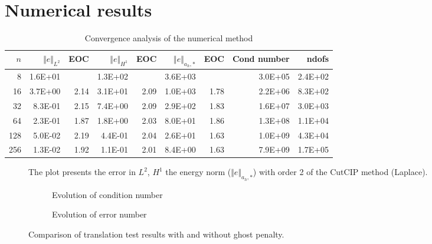 
\newpage
\section{Numerical results}%
\label{sec:numerical_results}


\begin{table}[h!]
    \caption{Convergence analysis of the numerical method}
    \label{table:CutFEM_error1}
  \begin{tabular}{rrrrrrrrr}
    \hline\hline
    \textbf{$n$} & \textbf{$\Vert e \Vert_{L^2}$} & \textbf{EOC} & \textbf{$ \Vert e \Vert_{H^1}$} & \textbf{EOC} & \textbf{$\Vert e \Vert_{ a_h,* }$} & \textbf{EOC} & \textbf{Cond number} & \textbf{ndofs} \\\hline
    8 & 1.6E+01 &  & 1.3E+02 &  & 3.6E+03 &  & 3.0E+05 & 2.4E+02 \\
    16 & 3.7E+00 & 2.14 & 3.1E+01 & 2.09 & 1.0E+03 & 1.78 & 2.2E+06 & 8.3E+02 \\
    32 & 8.3E-01 & 2.15 & 7.4E+00 & 2.09 & 2.9E+02 & 1.83 & 1.6E+07 & 3.0E+03 \\
    64 & 2.3E-01 & 1.87 & 1.8E+00 & 2.03 & 8.0E+01 & 1.86 & 1.3E+08 & 1.1E+04 \\
    128 & 5.0E-02 & 2.19 & 4.4E-01 & 2.04 & 2.6E+01 & 1.63 & 1.0E+09 & 4.3E+04 \\
    256 & 1.3E-02 & 1.92 & 1.1E-01 & 2.01 & 8.4E+00 & 1.63 & 7.9E+09 & 1.7E+05 \\\hline\hline
  \end{tabular}

\end{table}

\begin{figure}[h!]
    \centering
    
    \caption{The plot presents the error in $L^2$, $H^1$ the energy norm ($\Vert e \Vert_{a_h,*}$) with order 2 of the CutCIP method (Laplace).}
    \label{fig:CutFEM_error1}
\end{figure}

\begin{figure}[h!]
    \centering
    \begin{subfigure}{0.49\textwidth}
        \centering
        
        \caption{Evolution of condition number}
        \label{subfig:cond}
    \end{subfigure}
    \hfill
    \begin{subfigure}{0.49\textwidth}
        \centering
        
        \caption{Evolution of error number}
        \label{subfig:error}
    \end{subfigure}
    \caption{Comparison of translation test results with and without ghost penalty.}
    \label{fig:combined}
\end{figure}




